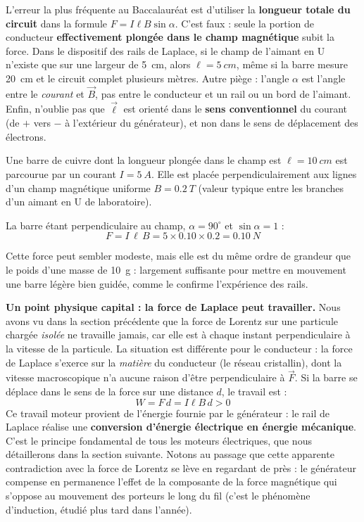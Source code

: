 \documentclass[11pt]{article}
\newcounter{popsec}
\newcounter{popsub}
\newcommand{\courssub}[1]{%
  \stepcounter{popsub}%
  \par\vspace{9pt}\noindent{\popxbold\fontsize{11.5}{13}\selectfont\color{popink}{\color{poporange}\thepopsec.\thepopsub}\hspace{6pt}#1}\par\nopagebreak\vspace{4pt}
}
\begin{document}
\begin{attention}
L'erreur la plus fréquente au Baccalauréat est d'utiliser la \textbf{longueur totale du circuit} dans la formule $F = I\ell B\sin\alpha$. C'est faux : seule la portion de conducteur \textbf{effectivement plongée dans le champ magnétique} subit la force. Dans le dispositif des rails de Laplace, si le champ de l'aimant en U n'existe que sur une largeur de \SI{5}{cm}, alors $\ell = \SI{5}{cm}$, même si la barre mesure \SI{20}{cm} et le circuit complet plusieurs mètres. Autre piège : l'angle $\alpha$ est l'angle entre le \emph{courant} et $\vec{B}$, pas entre le conducteur et un rail ou un bord de l'aimant. Enfin, n'oublie pas que $\vec{\ell}$ est orienté dans le \textbf{sens conventionnel} du courant (de $+$ vers $-$ à l'extérieur du générateur), et non dans le sens de déplacement des électrons.
\end{attention}

\courssub{Exemple chiffré et bilan énergétique}

\begin{exemplebox}
Une barre de cuivre dont la longueur plongée dans le champ est $\ell = \SI{10}{cm}$ est parcourue par un courant $I = \SI{5}{A}$. Elle est placée perpendiculairement aux lignes d'un champ magnétique uniforme $B = \SI{0,2}{T}$ (valeur typique entre les branches d'un aimant en U de laboratoire).

La barre étant perpendiculaire au champ, $\alpha = 90^\circ$ et $\sin\alpha = 1$ :
\[ F = I\,\ell\,B = 5 \times \num{0,10} \times \num{0,2} = \SI{0,10}{N} \]

Cette force peut sembler modeste, mais elle est du même ordre de grandeur que le poids d'une masse de \SI{10}{g} : largement suffisante pour mettre en mouvement une barre légère bien guidée, comme le confirme l'expérience des rails.
\end{exemplebox}

\textbf{Un point physique capital : la force de Laplace peut travailler.} Nous avons vu dans la section précédente que la force de Lorentz sur une particule chargée \emph{isolée} ne travaille jamais, car elle est à chaque instant perpendiculaire à la vitesse de la particule. La situation est différente pour le conducteur : la force de Laplace s'exerce sur la \emph{matière} du conducteur (le réseau cristallin), dont la vitesse macroscopique n'a aucune raison d'être perpendiculaire à $\vec{F}$. Si la barre se déplace dans le sens de la force sur une distance $d$, le travail est :
\[ W = F\,d = I\ell B\,d > 0 \]
Ce travail moteur provient de l'énergie fournie par le générateur : le rail de Laplace réalise une \textbf{conversion d'énergie électrique en énergie mécanique}. C'est le principe fondamental de tous les moteurs électriques, que nous détaillerons dans la section suivante. Notons au passage que cette apparente contradiction avec la force de Lorentz se lève en regardant de près : le générateur compense en permanence l'effet de la composante de la force magnétique qui s'oppose au mouvement des porteurs le long du fil (c'est le phénomène d'induction, étudié plus tard dans l'année).
\end{document}
